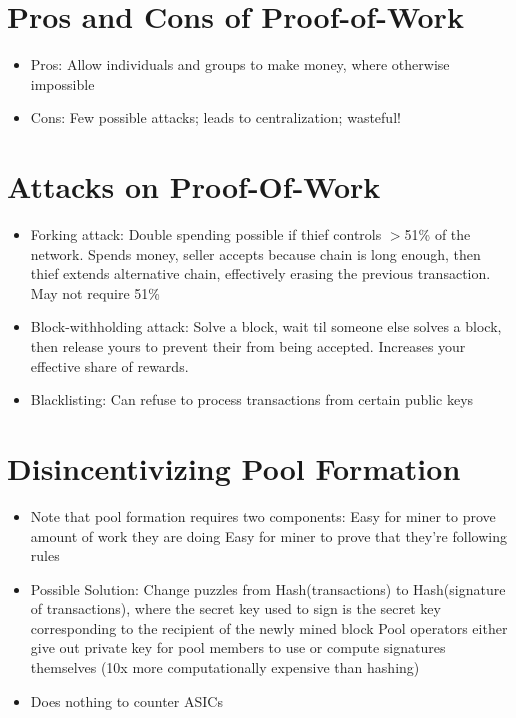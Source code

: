 \documentclass{article}
\begin{document}
\section{Pros and Cons of Proof-of-Work}
\begin{itemize}
\item Pros: Allow individuals and groups to make money, where otherwise impossible
\item Cons: Few possible attacks; leads to centralization; wasteful!
\end{itemize}

\section{Attacks on Proof-Of-Work}
\begin{itemize}
\item Forking attack: Double spending possible if thief controls $>$51\% of the network. Spends money, seller accepts because chain is long enough, then thief extends alternative chain, effectively erasing the previous transaction. May not require 51\%
\item Block-withholding attack: Solve a block, wait til someone else solves a block, then release yours to prevent their from being accepted. Increases your effective share of rewards.
\item Blacklisting: Can refuse to process transactions from certain public keys
\end{itemize}

\section{Disincentivizing Pool Formation}
\begin{itemize}
\item Note that pool formation requires two components:
\subitem Easy for miner to prove amount of work they are doing
\subitem Easy for miner to prove that they're following rules
\item Possible Solution: Change puzzles from Hash(transactions) to Hash(signature of transactions), where the secret key used to sign is the secret key corresponding to the recipient of the newly mined block
\subitem Pool operators either give out private key for pool members to use
\subitem or compute signatures themselves (10x more computationally expensive than hashing)
\item Does nothing to counter ASICs
\end{itemize}
\end{document}
